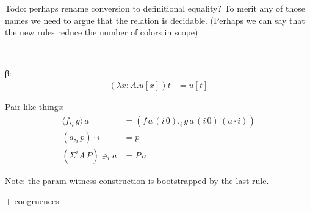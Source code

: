 \documentclass[english]{PaperTools/latex/lipics}
\newcommand\CP[3]{(#2,_{#1} #3)}
\newcommand\CSig[1]{\Sigma^{#1}}
\newcommand\param[1]{\!\cdot\!#1}
\newcommand\op[1]{∋_{#1}}
\newcommand\ip[3]{Σ^{#1} {#2}\,{#3}}
\newcommand\fp[3]{⟨#2 ,_{#1} #3⟩}
\newcommand\mor[2]{({#1}\,{#2})}
\newcommand\proj[2]{{#2}\,\mor{#1}0}
\newcommand\comment[1]{}
\begin{document}
\comment{
\begin{definition}[Normal forms and neutral terms]~
  \begin{align*}
    \mathsf{Nf} ∋ u,v,A,B & \coloneqq
      U \mid λx:A. t \mid (x:A) → B \\
      & \mid \CP i u v \mid \fp i u v \\
      & \mid {(\ip {i₀} A B)} \op {i₁} {u_1 \cdots} \op {i_n} {u_n} &\quad \text{($i₀ \prec i₁ \prec \ldots \prec i_n$)} \\
      & \mid s \param {i₀} \cdots \param {i_{n-1}}                  &\quad \text{($i₀ \prec   < \ldots \prec i_{n-1}$)}
    \\
    \mathsf{Ne} ∋ s & \coloneqq x \mid s \, u
  \end{align*}
\end{definition}
}

Todo: perhaps rename conversion to definitional equality? To merit any of those names we need to argue that the relation is decidable. (Perhaps we can say that the new rules reduce the number of colors in scope)
\begin{definition}[Conversion]~
\label{def:conversion}

β:
\begin{align*}
  (λx:A. u[x]) t &= u[t]
\end{align*}

Pair-like things:
\begin{align*}
  {\fp i f g} \, a      &= (f\,{\proj i a} ,_i g\,{\proj i a}\,{(a \param i)}) \\
  {(a,_i p)} \param i   &= p \\
  {(\ip i A P)} \op i a &= P\,a
\end{align*}

Note: the param-witness construction is bootstrapped by the last rule.

  + congruences
\end{definition}
\end{document}

